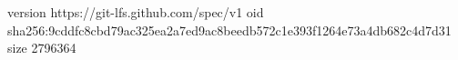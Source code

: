 version https://git-lfs.github.com/spec/v1
oid sha256:9cddfc8cbd79ac325ea2a7ed9ac8beedb572c1e393f1264e73a4db682c4d7d31
size 2796364
